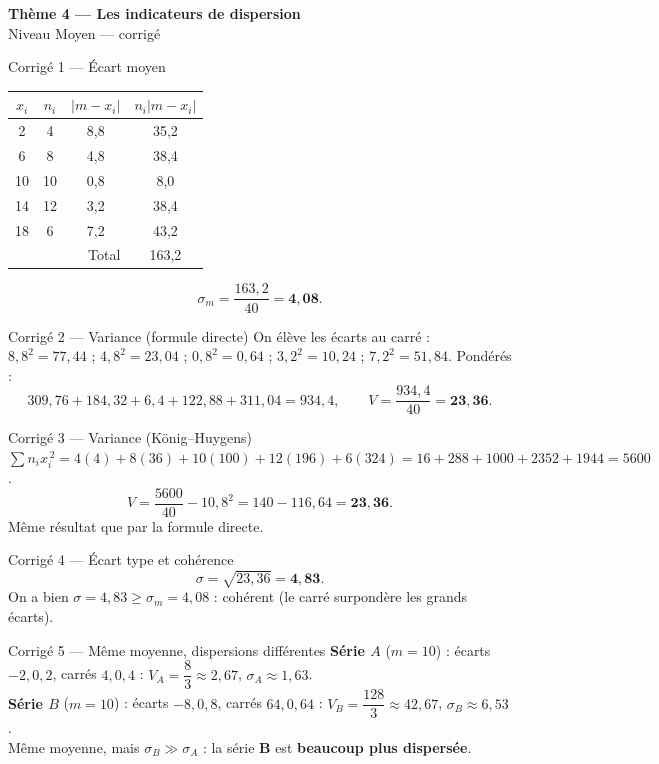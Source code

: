 \documentclass[11pt,a4paper]{article}
\newcommand{\bandeau}[2]{%
\begin{tcolorbox}[boxbase,colback=primary,colframe=primarydark,halign=center,
   before skip=2pt,after skip=12pt]
{\LARGE\bfseries\color{white} #1}\\[3pt]{\normalsize\color{white} #2}
\end{tcolorbox}}
\newcommand{\ecm}{\sigma_m}
\newcommand{\ect}{\sigma}
\begin{document}
\bandeau{Thème 4 — Les indicateurs de dispersion}{Niveau Moyen — corrigé}

\begin{corbox}{Corrigé 1 — Écart moyen}
\begin{center}
\renewcommand{\arraystretch}{1.15}
\begin{tabular}{|c|c|c|c|}
\hline
\rowcolor{primary!18}
$x_i$ & $n_i$ & $|m-x_i|$ & $n_i|m-x_i|$ \\\hline
2  & 4  & 8{,}8 & 35{,}2 \\
6  & 8  & 4{,}8 & 38{,}4 \\
10 & 10 & 0{,}8 & 8{,}0 \\
14 & 12 & 3{,}2 & 38{,}4 \\
18 & 6  & 7{,}2 & 43{,}2 \\\hline
\multicolumn{3}{|r|}{Total} & 163{,}2 \\\hline
\end{tabular}
\end{center}
\[ \ecm=\frac{163{,}2}{40}=\mathbf{4{,}08}. \]
\end{corbox}

\begin{corbox}{Corrigé 2 — Variance (formule directe)}
On élève les écarts au carré : $8{,}8^2=77{,}44$ ; $4{,}8^2=23{,}04$ ; $0{,}8^2=0{,}64$ ;
$3{,}2^2=10{,}24$ ; $7{,}2^2=51{,}84$. Pondérés :
\[
309{,}76+184{,}32+6{,}4+122{,}88+311{,}04=934{,}4,\qquad V=\frac{934{,}4}{40}=\mathbf{23{,}36}.
\]
\end{corbox}

\begin{corbox}{Corrigé 3 — Variance (König--Huygens)}
$\sum n_i x_i^{\,2}=4(4)+8(36)+10(100)+12(196)+6(324)=16+288+1000+2352+1944=5600$.
\[ V=\frac{5600}{40}-10{,}8^2=140-116{,}64=\mathbf{23{,}36}. \]
Même résultat que par la formule directe. \checkmark
\end{corbox}

\begin{corbox}{Corrigé 4 — Écart type et cohérence}
\[ \ect=\sqrt{23{,}36}=\mathbf{4{,}83}. \]
On a bien $\ect=4{,}83\geqslant\ecm=4{,}08$ : cohérent (le carré surpondère les grands écarts).
\end{corbox}

\begin{corbox}{Corrigé 5 — Même moyenne, dispersions différentes}
\textbf{Série $A$} ($m=10$) : écarts $-2,0,2$, carrés $4,0,4$ :
$V_A=\dfrac{8}{3}\approx2{,}67$, $\ect_A\approx1{,}63$.\\
\textbf{Série $B$} ($m=10$) : écarts $-8,0,8$, carrés $64,0,64$ :
$V_B=\dfrac{128}{3}\approx42{,}67$, $\ect_B\approx6{,}53$.\\
Même moyenne, mais $\ect_B\gg\ect_A$ : la série $\mathbf{B}$ est \textbf{beaucoup plus dispersée}.
\end{corbox}
\end{document}
